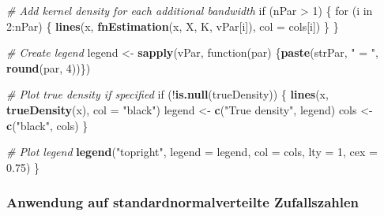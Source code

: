 \documentclass[10pt,]{article}
\newenvironment{Shaded}{\begin{snugshade}}{\end{snugshade}}
\newcommand{\KeywordTok}[1]{\textcolor[rgb]{0.13,0.29,0.53}{\textbf{{#1}}}}
\newcommand{\DataTypeTok}[1]{\textcolor[rgb]{0.13,0.29,0.53}{{#1}}}
\newcommand{\DecValTok}[1]{\textcolor[rgb]{0.00,0.00,0.81}{{#1}}}
\newcommand{\FloatTok}[1]{\textcolor[rgb]{0.00,0.00,0.81}{{#1}}}
\newcommand{\StringTok}[1]{\textcolor[rgb]{0.31,0.60,0.02}{{#1}}}
\newcommand{\CommentTok}[1]{\textcolor[rgb]{0.56,0.35,0.01}{\textit{{#1}}}}
\newcommand{\NormalTok}[1]{{#1}}
\begin{document}
\begin{Shaded}
\begin{Highlighting}[]
  \CommentTok{# Add kernel density for each additional bandwidth}
  \NormalTok{if (nPar >}\StringTok{ }\DecValTok{1}\NormalTok{) \{}
    \NormalTok{for (i in }\DecValTok{2}\NormalTok{:nPar) \{}
      \KeywordTok{lines}\NormalTok{(x, }\KeywordTok{fnEstimation}\NormalTok{(x, X, K, vPar[i]), }\DataTypeTok{col =} \NormalTok{cols[i])}
    \NormalTok{\}}
  \NormalTok{\}}
  
  \CommentTok{# Create legend}
  \NormalTok{legend <-}\StringTok{ }\KeywordTok{sapply}\NormalTok{(vPar, function(par) \{}\KeywordTok{paste}\NormalTok{(strPar, }\StringTok{" = "}\NormalTok{, }\KeywordTok{round}\NormalTok{(par, }\DecValTok{4}\NormalTok{))\})}
  
  \CommentTok{# Plot true density if specified}
  \NormalTok{if (!}\KeywordTok{is.null}\NormalTok{(trueDensity)) \{}
    \KeywordTok{lines}\NormalTok{(x, }\KeywordTok{trueDensity}\NormalTok{(x), }\DataTypeTok{col =} \StringTok{"black"}\NormalTok{)}
    \NormalTok{legend <-}\StringTok{ }\KeywordTok{c}\NormalTok{(}\StringTok{"True density"}\NormalTok{, legend)}
    \NormalTok{cols <-}\StringTok{ }\KeywordTok{c}\NormalTok{(}\StringTok{"black"}\NormalTok{, cols)}
  \NormalTok{\}}
  
  \CommentTok{# Plot legend}
  \KeywordTok{legend}\NormalTok{(}\StringTok{"topright"}\NormalTok{, }\DataTypeTok{legend =} \NormalTok{legend, }\DataTypeTok{col =} \NormalTok{cols, }\DataTypeTok{lty =} \DecValTok{1}\NormalTok{, }\DataTypeTok{cex =} \FloatTok{0.75}\NormalTok{)}
\NormalTok{\}}
\end{Highlighting}
\end{Shaded}

\subsubsection{Anwendung auf standardnormalverteilte
Zufallszahlen}\label{anwendung-auf-standardnormalverteilte-zufallszahlen}
\end{document}

